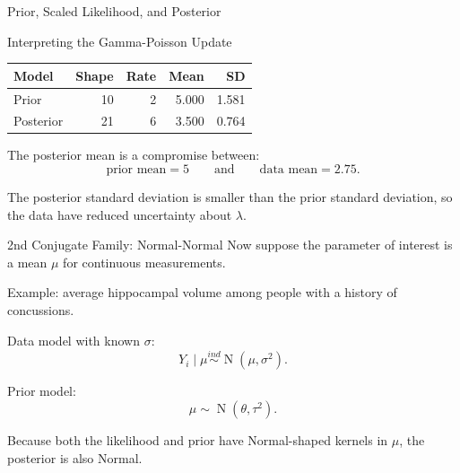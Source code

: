 \documentclass[aspectratio=43,11pt]{beamer}
\newcommand{\Normal}{\operatorname{N}}
\begin{document}
\begin{frame}{Prior, Scaled Likelihood, and Posterior}
\begin{center}
\end{center}
\end{frame}

\begin{frame}{Interpreting the Gamma-Poisson Update}
\begin{center}
\begin{tabular}{lrrrr}
\toprule
Model & Shape & Rate & Mean & SD \\
\midrule
Prior & 10 & 2 & 5.000 & 1.581 \\
Posterior & 21 & 6 & 3.500 & 0.764 \\
\bottomrule
\end{tabular}
\end{center}

\medskip
The posterior mean is a compromise between:
\[
  \text{prior mean}=5
  \qquad\text{and}\qquad
  \text{data mean}=2.75.
\]

\medskip
The posterior standard deviation is smaller than the prior standard deviation, so the data have reduced uncertainty about $\lambda$.
\end{frame}

\begin{frame}{2nd Conjugate Family: Normal-Normal}
Now suppose the parameter of interest is a mean $\mu$ for continuous measurements.

\medskip
Example: average hippocampal volume among people with a history of concussions.

\medskip
Data model with known $\sigma$:
\[
  Y_i\mid\mu\stackrel{ind}{\sim}\Normal(\mu,\sigma^2).
\]

Prior model:
\[
  \mu\sim\Normal(\theta,\tau^2).
\]

\medskip
Because both the likelihood and prior have Normal-shaped kernels in $\mu$, the posterior is also Normal.
\end{frame}
\end{document}
